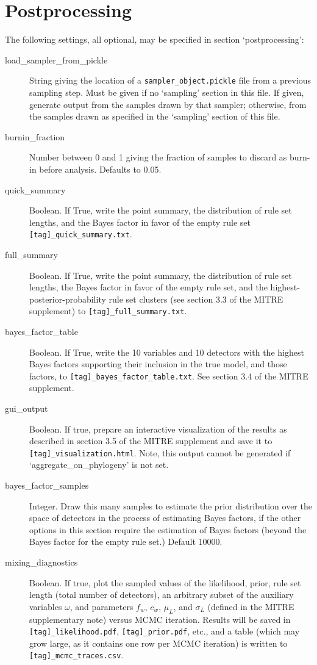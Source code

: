 \documentclass[12pt]{report}
\begin{document}
\section{Postprocessing}\label{postprocessing}
The following settings, all optional, may be specified in section `postprocessing':
\begin{description}
  \item[load\_sampler\_from\_pickle] String giving the location of a
    \texttt{sampler\_object.pickle} file from a previous sampling
    step. Must be given if no `sampling' section in this file. If
    given, generate output from the samples drawn by that sampler;
    otherwise, from the samples drawn as specified in the `sampling'
    section of this file.
  \item[burnin\_fraction] Number between 0 and 1 giving the fraction of
    samples to discard as burn-in before analysis. Defaults to 0.05.
  \item[quick\_summary] Boolean. If True, write the point summary,
    the distribution of rule set lengths, and the Bayes factor in
    favor of the empty rule set
    \texttt{[tag]\_quick\_summary.txt}.
  \item[full\_summary] Boolean. If True, write the point summary,
    the distribution of rule set lengths, the Bayes factor in
    favor of the empty rule set, and the highest-posterior-probability
    rule set clusters (see section 3.3 of the MITRE supplement) to
    \texttt{[tag]\_full\_summary.txt}.
  \item[bayes\_factor\_table] Boolean. If True, write the 10 variables
    and 10 detectors with the highest Bayes factors supporting their
    inclusion in the true model, and those factors, to
    \texttt{[tag]\_bayes\_factor\_table.txt}. See section 3.4 of the
    MITRE supplement.
  \item[gui\_output] Boolean. If true, prepare an interactive
    visualization of the results as described in section 3.5 of the
    MITRE supplement and save it to
    \texttt{[tag]\_visualization.html}. Note, this output cannot be
    generated if `aggregate\_on\_phylogeny' is not set.
  \item[bayes\_factor\_samples] Integer. Draw this many samples
    to estimate the prior distribution over the space of detectors in the
    process of estimating Bayes factors, if the other options in this
    section require the estimation of Bayes factors (beyond the
    Bayes factor for the empty rule set.) Default 10000.
  \item[mixing\_diagnostics] Boolean. If true, plot the sampled values
    of the likelihood, prior, rule set length (total number of
    detectors), an arbitrary subset of the auxiliary variables
    $\omega$, and parameters $f_w$, $c_w$, $\mu_L$, and $\sigma_L$
    (defined in the MITRE supplementary note) versus MCMC
    iteration. Results will be saved in
    \texttt{[tag]\_likelihood.pdf}, \texttt{[tag]\_prior.pdf}, etc.,
    and a table (which may grow large, as it contains one row per
    MCMC iteration) is written to
    \texttt{[tag]\_mcmc\_traces.csv}.

\end{description}
\end{document}

